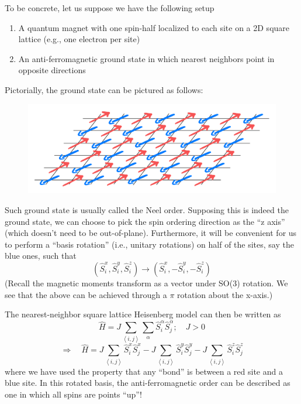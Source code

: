 To be concrete, let us suppose we have the following setup
\begin{enumerate}
    \item A quantum magnet with one spin-half localized to each site on a 2D square lattice (e.g., one electron per site)
    \item An anti-ferromagnetic ground state in which nearest neighbors point in opposite directions
\end{enumerate}

Pictorially, the ground state can be pictured as follows:
\begin{figure}[H]
    \centering
    \includegraphics[width=\textwidth]{jupyterbook/data/fig/lec25-fig05.png}
\end{figure}
Such ground state is usually called the Neel order. Supposing this is indeed the ground state, we can choose to pick the spin ordering direction as the ``z axis'' (which doesn't need to be out-of-plane). Furthermore, it will be convenient for us to perform a ``basis rotation'' (i.e., unitary rotations) on half of the sites, say the blue ones, such that
\[ \left( \hat{S}_{i}^{x},\hat{S}_{i}^{y},\hat{S}_{i}^{z} \right) \rightarrow \left( \hat{S}_{i}^{x},-\hat{S}_{i}^{y},-\hat{S}_{i}^{z} \right) \]
(Recall the magnetic moments transform as a vector under SO(3) rotation. We see that the above can be achieved through a $\pi$ rotation about the x-axis.)

The nearest-neighbor square lattice Heisenberg model can then be written as
\[ \hat{H}=J\sum_{\left< i,j \right>}{\sum_{\alpha}{\hat{S}_{i}^{\alpha}\hat{S}_{j}^{\alpha}}};\quad J>0\]
\[ \Rightarrow \quad \hat{H}=J\sum_{\left< i,j \right>}{\hat{S}_{i}^{x}\hat{S}_{j}^{x}}-J\sum_{\left< i,j \right>}{\hat{S}_{i}^{y}\hat{S}_{j}^{y}}-J\sum_{\left< i,j \right>}{\hat{S}_{i}^{z}\hat{S}_{j}^{z}}\]
where we have used the property that any ``bond'' is between a red site and a blue site. In this rotated basis, the anti-ferromagnetic order can be described as one in which all spins are points ``up''!

